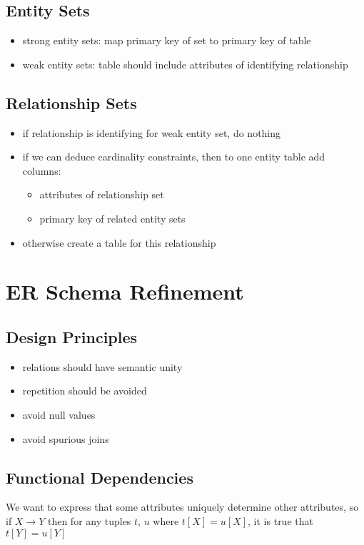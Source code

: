 \documentclass[]{article}
\theoremstyle{definition}
\begin{document}
	\subsection{Entity Sets}
	\begin{itemize}
		\item strong entity sets: map primary key of set to primary key of table
		\item weak entity sets: table should include attributes of identifying relationship
	\end{itemize}

	\subsection{Relationship Sets}
	\begin{itemize}
		\item if relationship is identifying for weak entity set, do nothing
		\item if we can deduce cardinality constraints, then to one entity table add columns:
			\begin{itemize}
				\item attributes of relationship set
				\item primary key of related entity sets
			\end{itemize}
		\item otherwise create a table for this relationship
	\end{itemize}

	\section{ER Schema Refinement}
	\subsection{Design Principles}
	\begin{itemize}
		\item relations should have semantic unity
		\item repetition should be avoided
		\item avoid null values
		\item avoid spurious joins
	\end{itemize}

	\subsection{Functional Dependencies}
	We want to express that some attributes uniquely determine other attributes, so if $X \rightarrow Y$
	then for any tuples $t$, $u$ where $t[X] = u[X]$, it is true that $t[Y] = u[Y]$
\end{document}
